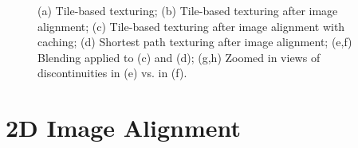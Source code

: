\documentclass{llncs}
\begin{document}
\begin{figure}
  \centering {}

  \caption{(a) Tile-based texturing; (b) Tile-based texturing after
    image alignment; (c) Tile-based texturing after image alignment
    with caching; (d) Shortest path texturing after image alignment;
    (e,f) Blending applied to (c) and (d); (g,h) Zoomed in views of
    discontinuities in (e) vs. in (f).}
  \label{fig:compareAll}
\end{figure}


\section{2D Image Alignment}
\label{sec:2dAlignment}
\end{document}
